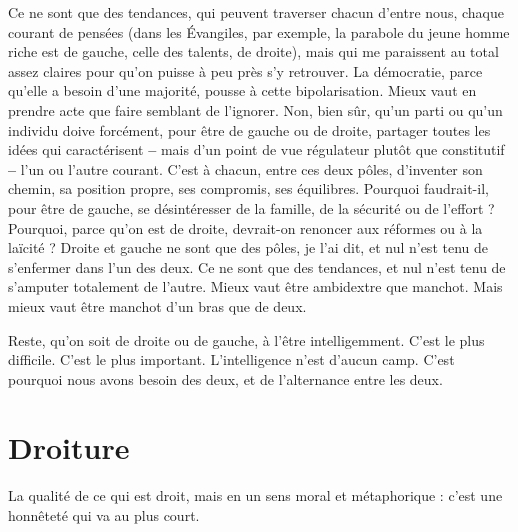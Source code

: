 Ce ne sont que des tendances, qui peuvent traverser chacun d’entre nous,
chaque courant de pensées (dans les Évangiles, par exemple, la parabole du
jeune homme riche est de gauche, celle des talents, de droite), mais qui me
paraissent au total assez claires pour qu’on puisse à peu près s’y retrouver. La
démocratie, parce qu’elle a besoin d’une majorité, pousse à cette bipolarisation.
Mieux vaut en prendre acte que faire semblant de l’ignorer. Non, bien sûr,
qu’un parti ou qu’un individu doive forcément, pour être de gauche ou de
droite, partager toutes les idées qui caractérisent {\bf --} mais d’un point de vue régulateur
plutôt que constitutif {\bf --} l’un ou l’autre courant. C’est à chacun, entre ces
deux pôles, d'inventer son chemin, sa position propre, ses compromis, ses équilibres.
Pourquoi faudrait-il, pour être de gauche, se désintéresser de la famille,
de la sécurité ou de l'effort ? Pourquoi, parce qu’on est de droite, devrait-on
renoncer aux réformes ou à la laïcité ? Droite et gauche ne sont que des pôles,
je l’ai dit, et nul n’est tenu de s’enfermer dans l’un des deux. Ce ne sont que des
tendances, et nul n’est tenu de s’amputer totalement de l’autre. Mieux vaut être
ambidextre que manchot. Mais mieux vaut être manchot d’un bras que de
deux.

Reste, qu’on soit de droite ou de gauche, à l’être intelligemment. C’est le
plus difficile. C’est le plus important. L'intelligence n’est d’aucun camp. C’est
pourquoi nous avons besoin des deux, et de l’alternance entre les deux.

\section{Droiture}
La qualité de ce qui est droit, mais en un sens moral et métaphorique :
c’est une honnêteté qui va au plus court.

